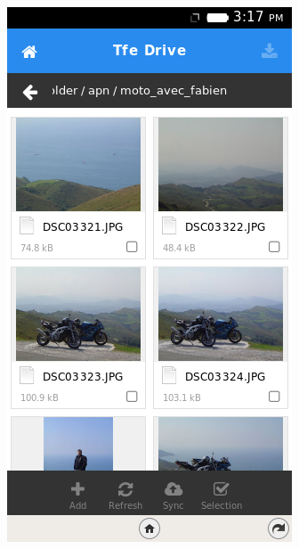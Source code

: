 \documentclass{beamer}
\begin{document}
\begin{frame}
\begin{center}
\includegraphics[scale=0.5] {./images/TFEDrive03.png} 
\end{center}
\end{frame}
\end{document}

